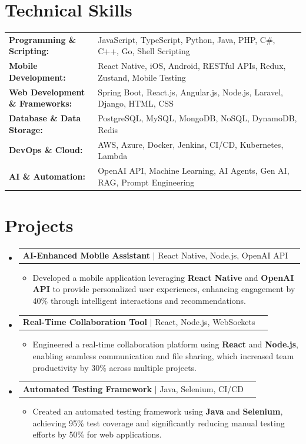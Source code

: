 \documentclass[letterpaper,10pt]{article}
\makeatletter
\newcommand{\resumeItem}[1]{
  \item{\fontsize{8pt}{9pt}\selectfont
    #1 \vspace{-3pt}
  }
}
\newcommand{\resumeProjectHeading}[2]{
    \item
    \begin{tabular*}{1.001\textwidth}{l@{\extracolsep{\fill}}r}
      \fontsize{8.5pt}{10pt}#1 & \textbf{\fontsize{8.5pt}{10pt} #2}\\
    \end{tabular*}\vspace{-7pt}
}
\newcommand{\resumeSubHeadingListStart}{\begin{itemize}[leftmargin=0pt, label={}]}
\newcommand{\resumeSubHeadingListEnd}{\end{itemize}}
\newcommand{\resumeItemListStart}{\begin{itemize}[leftmargin=*]}
\newcommand{\resumeItemListEnd}{\end{itemize}\vspace{-5pt}}
\makeatother
\begin{document}
\section{Technical Skills}
        \vspace{-14pt}
        \begin{table}[h]
            \fontsize{8pt}{9pt}\selectfont
            \begin{tabular}{p{0.3\linewidth} p{0.7\linewidth}}
                \textbf{Programming \& Scripting:} & JavaScript, TypeScript, Python, Java, PHP, C\#, C++, Go, Shell Scripting \\
                \textbf{Mobile Development:} & React Native, iOS, Android, RESTful APIs, Redux, Zustand, Mobile Testing \\
                \textbf{Web Development \& Frameworks:} & Spring Boot, React.js, Angular.js, Node.js, Laravel, Django, HTML, CSS \\
                \textbf{Database \& Data Storage:} & PostgreSQL, MySQL, MongoDB, NoSQL, DynamoDB, Redis \\
                \textbf{DevOps \& Cloud:} & AWS, Azure, Docker, Jenkins, CI/CD, Kubernetes, Lambda \\
                \textbf{AI \& Automation:} & OpenAI API, Machine Learning, AI Agents, Gen AI, RAG, Prompt Engineering \\
            \end{tabular}
        \end{table}
 \vspace{-18pt}

\section{Projects}
    \vspace{-5pt}
    \resumeSubHeadingListStart
          \resumeProjectHeading
            {\textbf{AI-Enhanced Mobile Assistant} $|$ React Native, Node.js, OpenAI API}{}
            \resumeItemListStart
                \resumeItem{Developed a mobile application leveraging \textbf{React Native} and \textbf{OpenAI API} to provide personalized user experiences, enhancing engagement by 40\% through intelligent interactions and recommendations.}
            \resumeItemListEnd
        \vspace{-12pt}
    
        \resumeProjectHeading
            {\textbf{Real-Time Collaboration Tool} $|$ React, Node.js, WebSockets}{}
        \resumeItemListStart
                \resumeItem{Engineered a real-time collaboration platform using \textbf{React} and \textbf{Node.js}, enabling seamless communication and file sharing, which increased team productivity by 30\% across multiple projects.}
        \resumeItemListEnd
      \vspace{-12pt}
      \resumeProjectHeading
        {\textbf{Automated Testing Framework} $|$ Java, Selenium, CI/CD}{}
    \resumeItemListStart
            \resumeItem{Created an automated testing framework using \textbf{Java} and \textbf{Selenium}, achieving 95\% test coverage and significantly reducing manual testing efforts by 50\% for web applications.}
    \resumeItemListEnd
    \resumeSubHeadingListEnd
\end{document}
